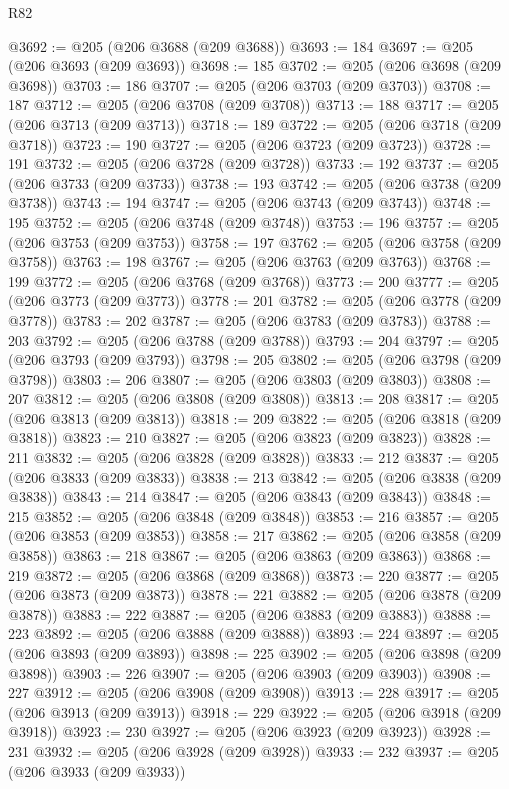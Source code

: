 \begin{lexlean}{R82}
\begin{coremodule}
@3692 := @205 (@206 @3688 (@209 @3688))
@3693 := 184
@3697 := @205 (@206 @3693 (@209 @3693))
@3698 := 185
@3702 := @205 (@206 @3698 (@209 @3698))
@3703 := 186
@3707 := @205 (@206 @3703 (@209 @3703))
@3708 := 187
@3712 := @205 (@206 @3708 (@209 @3708))
@3713 := 188
@3717 := @205 (@206 @3713 (@209 @3713))
@3718 := 189
@3722 := @205 (@206 @3718 (@209 @3718))
@3723 := 190
@3727 := @205 (@206 @3723 (@209 @3723))
@3728 := 191
@3732 := @205 (@206 @3728 (@209 @3728))
@3733 := 192
@3737 := @205 (@206 @3733 (@209 @3733))
@3738 := 193
@3742 := @205 (@206 @3738 (@209 @3738))
@3743 := 194
@3747 := @205 (@206 @3743 (@209 @3743))
@3748 := 195
@3752 := @205 (@206 @3748 (@209 @3748))
@3753 := 196
@3757 := @205 (@206 @3753 (@209 @3753))
@3758 := 197
@3762 := @205 (@206 @3758 (@209 @3758))
@3763 := 198
@3767 := @205 (@206 @3763 (@209 @3763))
@3768 := 199
@3772 := @205 (@206 @3768 (@209 @3768))
@3773 := 200
@3777 := @205 (@206 @3773 (@209 @3773))
@3778 := 201
@3782 := @205 (@206 @3778 (@209 @3778))
@3783 := 202
@3787 := @205 (@206 @3783 (@209 @3783))
@3788 := 203
@3792 := @205 (@206 @3788 (@209 @3788))
@3793 := 204
@3797 := @205 (@206 @3793 (@209 @3793))
@3798 := 205
@3802 := @205 (@206 @3798 (@209 @3798))
@3803 := 206
@3807 := @205 (@206 @3803 (@209 @3803))
@3808 := 207
@3812 := @205 (@206 @3808 (@209 @3808))
@3813 := 208
@3817 := @205 (@206 @3813 (@209 @3813))
@3818 := 209
@3822 := @205 (@206 @3818 (@209 @3818))
@3823 := 210
@3827 := @205 (@206 @3823 (@209 @3823))
@3828 := 211
@3832 := @205 (@206 @3828 (@209 @3828))
@3833 := 212
@3837 := @205 (@206 @3833 (@209 @3833))
@3838 := 213
@3842 := @205 (@206 @3838 (@209 @3838))
@3843 := 214
@3847 := @205 (@206 @3843 (@209 @3843))
@3848 := 215
@3852 := @205 (@206 @3848 (@209 @3848))
@3853 := 216
@3857 := @205 (@206 @3853 (@209 @3853))
@3858 := 217
@3862 := @205 (@206 @3858 (@209 @3858))
@3863 := 218
@3867 := @205 (@206 @3863 (@209 @3863))
@3868 := 219
@3872 := @205 (@206 @3868 (@209 @3868))
@3873 := 220
@3877 := @205 (@206 @3873 (@209 @3873))
@3878 := 221
@3882 := @205 (@206 @3878 (@209 @3878))
@3883 := 222
@3887 := @205 (@206 @3883 (@209 @3883))
@3888 := 223
@3892 := @205 (@206 @3888 (@209 @3888))
@3893 := 224
@3897 := @205 (@206 @3893 (@209 @3893))
@3898 := 225
@3902 := @205 (@206 @3898 (@209 @3898))
@3903 := 226
@3907 := @205 (@206 @3903 (@209 @3903))
@3908 := 227
@3912 := @205 (@206 @3908 (@209 @3908))
@3913 := 228
@3917 := @205 (@206 @3913 (@209 @3913))
@3918 := 229
@3922 := @205 (@206 @3918 (@209 @3918))
@3923 := 230
@3927 := @205 (@206 @3923 (@209 @3923))
@3928 := 231
@3932 := @205 (@206 @3928 (@209 @3928))
@3933 := 232
@3937 := @205 (@206 @3933 (@209 @3933))

\end{coremodule}
\end{lexlean}
